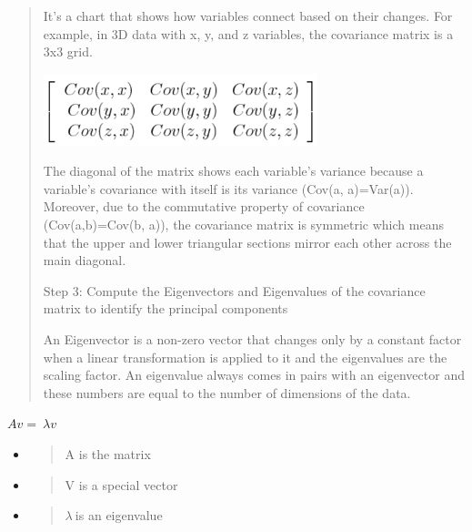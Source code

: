 \documentclass[
]{article}
\begin{document}
\begin{quote}
It's a chart that shows how variables connect based on their changes.
For example, in 3D data with x, y, and z variables, the covariance
matrix is a 3x3 grid.

\includegraphics[width=3.14583in,height=0.82188in]{vertopal_f239f640fefe43bb8bc0698cafd57825/media/image8.png}

The diagonal of the matrix shows each variable's variance because a
variable's covariance with itself is its variance (Cov(a, a)=Var(a)).
Moreover, due to the commutative property of covariance (Cov(a,b)=Cov(b,
a)), the covariance matrix is symmetric which means that the upper and
lower triangular sections mirror each other across the main diagonal.

Step 3: Compute the Eigenvectors and Eigenvalues of the covariance
matrix to identify the principal components

An Eigenvector is a non-zero vector that changes only by a constant
factor when a linear transformation is applied to it and the eigenvalues
are the scaling factor. An eigenvalue always comes in pairs with an
eigenvector and these numbers are equal to the number of dimensions of
the data.
\end{quote}

\(Av = \ \lambda v\)

\begin{itemize}
\item
  \begin{quote}
  A is the matrix
  \end{quote}
\item
  \begin{quote}
  V is a special vector
  \end{quote}
\item
  \begin{quote}
  \(\lambda\ \)is an eigenvalue
  \end{quote}
\end{itemize}
\end{document}
